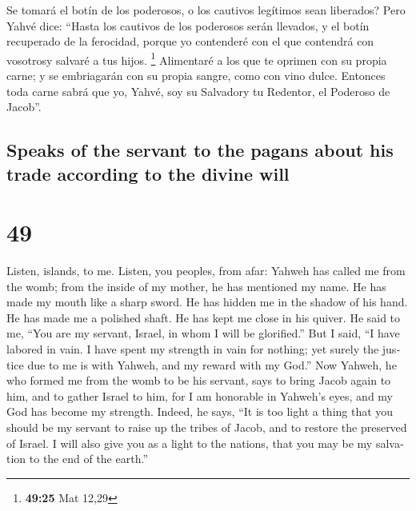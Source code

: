 \begin{paracol}{2}
 Se tomará el botín de los poderosos, o los cautivos
legítimos sean liberados?  Pero Yahvé dice: ``Hasta los
cautivos de los poderosos serán llevados, y el botín recuperado de la
ferocidad, porque yo contenderé con el que contendrá con vosotrosy
salvaré a tus hijos. \footnote{\textbf{49:25} Mat 12,29} 
Alimentaré a los que te oprimen con su propia carne; y se embriagarán
con su propia sangre, como con vino dulce. Entonces toda carne sabrá que
yo, Yahvé, soy su Salvadory tu Redentor, el Poderoso de Jacob''.

\switchcolumn
\begin{otherlanguage}{english}

\hypertarget{speaks-of-the-servant-to-the-pagans-about-his-trade-according-to-the-divine-will}{%
\subsection{Speaks of the servant to the pagans about his trade
according to the divine
will}\label{speaks-of-the-servant-to-the-pagans-about-his-trade-according-to-the-divine-will}}

\hypertarget{section-97}{%
\section{49}\label{section-97}}

 Listen, islands, to me. Listen, you peoples, from afar:
Yahweh has called me from the womb; from the inside of my mother, he has
mentioned my name.  He has made my mouth like a sharp
sword. He has hidden me in the shadow of his hand. He has made me a
polished shaft. He has kept me close in his quiver.  He
said to me, ``You are my servant, Israel, in whom I will be glorified.''
 But I said, ``I have labored in vain. I have spent my
strength in vain for nothing; yet surely the justice due to me is with
Yahweh, and my reward with my God.''  Now Yahweh, he who
formed me from the womb to be his servant, says to bring Jacob again to
him, and to gather Israel to him, for I am honorable in Yahweh's eyes,
and my God has become my strength.  Indeed, he says, ``It
is too light a thing that you should be my servant to raise up the
tribes of Jacob, and to restore the preserved of Israel. I will also
give you as a light to the nations, that you may be my salvation to the
end of the earth.''

\hypertarget{god-promises-the-greatest-glorification-to-his-deeply-humiliated-people}{%
}
\end{otherlanguage}
\end{paracol}

